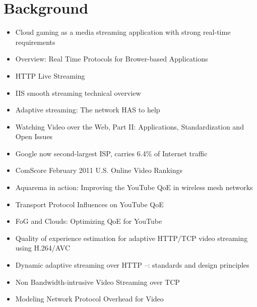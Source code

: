 \section{Background}
\label{c3:background}

\begin{itemize}


	\item Cloud gaming as a media streaming application with strong real-time requirements \cite{4795441,wang2009modeling,jarschel2011cloudevaluation,ct2010wolken}

	\item Overview: Real Time Protocols for Brower-based Applications\cite{ietf2011rtcwebdraft}
	\item HTTP Live Streaming \cite{pantos2011livestreaming}
	\item IIS smooth streaming technical overview \cite{zambelli_iis_2009}
	\item Adaptive streaming: The network HAS to help \cite{BLTJ:BLTJ20505}
	\item Watching Video over the Web, Part II: Applications, Standardization and Open Issues \cite{watching-video2}
	\item Google now second-largest ISP, carries 6.4\% of Internet traffic \cite{nw2010carrier}
	\item ComScore February 2011 U.S. Online Video Rankings \cite{comscore2011ranking}
	\item Aquarema in action: Improving the YouTube QoE in wireless mesh networks \cite{5733220}
	\item Transport Protocol Influences on YouTube QoE \cite{report2011-258}
	\item FoG and Clouds: Optimizing QoE for YouTube \cite{hossfeld2011fog}
	\item Quality of experience estimation for adaptive HTTP/TCP video streaming using H.264/AVC \cite{6181070}
	\item Dynamic adaptive streaming over HTTP --: standards and design principles \cite{Stockhammer:2011:DAS:1943552.1943572}
	\item Non Bandwidth-intrusive Video Streaming over TCP \cite{5945211}
	\item Modeling Network Protocol Overhead for Video \cite{5703713}

\end{itemize}
